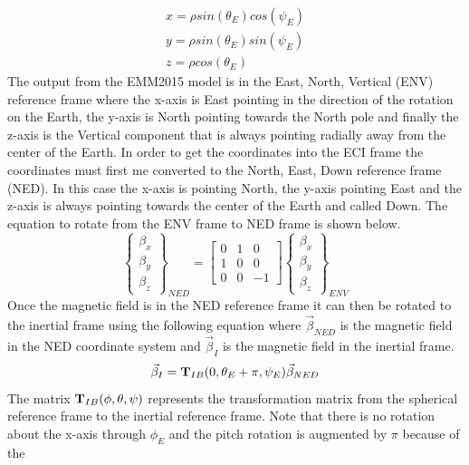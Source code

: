 \documentclass{article}
\begin{document}
\begin{equation}
\begin{matrix}
x = \rho sin(\theta_E) cos(\psi_E)\\
y = \rho sin(\theta_E) sin(\psi_E)\\
z = \rho cos(\theta_E)
\end{matrix}
\end{equation}
The output from the EMM2015 model is in the East, North, Vertical (ENV) reference frame
where the x-axis is East pointing in the direction of the rotation on
the Earth, the y-axis is North pointing towards the North pole and
finally the z-axis is the Vertical component that is always pointing
radially away from the center of the Earth. In order to get the
coordinates into the ECI frame the coordinates must first me converted
to the North, East, Down reference frame (NED). In this case the
x-axis is pointing North, the y-axis pointing East and the z-axis is
always pointing towards the center of the Earth and called Down. The
equation to rotate from the ENV frame to NED frame is shown below.
\begin{equation}
  \begin{Bmatrix} \beta_x \\ \beta_y \\ \beta_z \end{Bmatrix}_{NED}
  = \begin{bmatrix} 0 & 1 & 0 \\ 1 & 0 & 0 \\ 0 & 0 & -1 \end{bmatrix} \begin{Bmatrix} \beta_x \\ \beta_y \\ \beta_z \end{Bmatrix}_{ENV}
\end{equation}
Once the magnetic field is in the NED reference frame it can then be
rotated to the inertial frame using the following equation where $\vec{\beta}_{NED}$ is the
magnetic field in the NED coordinate system and $\vec{\beta}_I$ is the
magnetic field in the inertial frame. 
\begin{equation}\label{e:sph_inertial}
  \vec{\beta}_I = {\bf T}_{IB}(0,\theta_E+\pi,\psi_E)\vec{\beta}_{NED}
\end{equation}
The matrix ${\bf T}_{IB}(\phi,\theta,\psi)$ represents the transformation
matrix from the spherical reference frame to the inertial reference
frame. Note that there is no rotation about the x-axis through
$\phi_E$ and the pitch rotation is augmented by $\pi$ because of the
\end{document}
